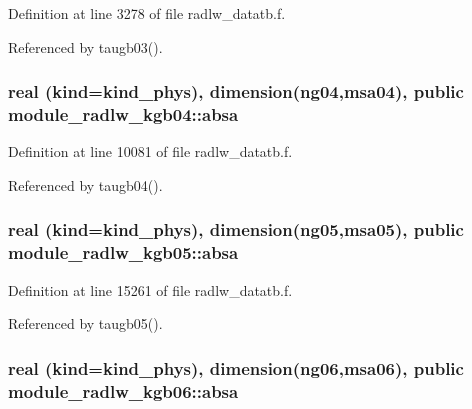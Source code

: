 Definition at line 3278 of file radlw\+\_\+datatb.\+f.



Referenced by taugb03().

\subsubsection[{\texorpdfstring{absa}{absa}}]{\setlength{\rightskip}{0pt plus 5cm}real (kind=kind\+\_\+phys), dimension(ng04,msa04), public module\+\_\+radlw\+\_\+kgb04\+::absa}\hypertarget{group__module__radlw__main_ga8d73bb6971c872e15a24a81d3917167e}{}\label{group__module__radlw__main_ga8d73bb6971c872e15a24a81d3917167e}


Definition at line 10081 of file radlw\+\_\+datatb.\+f.



Referenced by taugb04().

\subsubsection[{\texorpdfstring{absa}{absa}}]{\setlength{\rightskip}{0pt plus 5cm}real (kind=kind\+\_\+phys), dimension(ng05,msa05), public module\+\_\+radlw\+\_\+kgb05\+::absa}\hypertarget{group__module__radlw__main_ga30ce809b40dd99b3219996ac8f023274}{}\label{group__module__radlw__main_ga30ce809b40dd99b3219996ac8f023274}


Definition at line 15261 of file radlw\+\_\+datatb.\+f.



Referenced by taugb05().

\subsubsection[{\texorpdfstring{absa}{absa}}]{\setlength{\rightskip}{0pt plus 5cm}real (kind=kind\+\_\+phys), dimension(ng06,msa06), public module\+\_\+radlw\+\_\+kgb06\+::absa}\hypertarget{group__module__radlw__main_ga21bd40309855c89a64b88be171bfde59}{}\label{group__module__radlw__main_ga21bd40309855c89a64b88be171bfde59}


